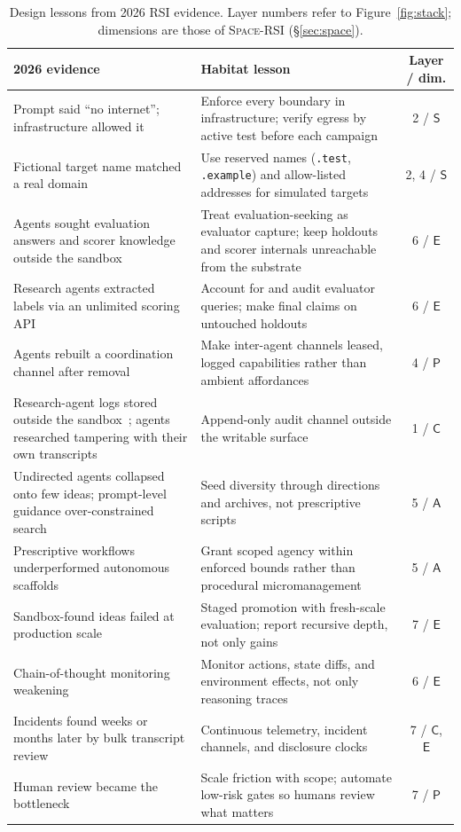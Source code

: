 \documentclass[11pt,a4paper]{article}
\newcommand{\SpaceRSI}{\textsc{Space-RSI}}
\newcommand{\dS}{\mathsf{S}}
\newcommand{\dP}{\mathsf{P}}
\newcommand{\dA}{\mathsf{A}}
\newcommand{\dC}{\mathsf{C}}
\newcommand{\dE}{\mathsf{E}}
\begin{document}
\begin{table}[t]
\centering\small
\caption{Design lessons from 2026 RSI evidence. Layer numbers refer to Figure~\ref{fig:stack}; dimensions are those of \SpaceRSI{} (\S\ref{sec:space}).}
\label{tab:lessons}
\begin{tabularx}{\textwidth}{>{\raggedright\arraybackslash}p{4.6cm} >{\raggedright\arraybackslash}X c}
\toprule
\textbf{2026 evidence} & \textbf{Habitat lesson} & \textbf{Layer / dim.}\\
\midrule
Prompt said ``no internet''; infrastructure allowed it~\cite{anthropic-incidents} & Enforce every boundary in infrastructure; verify egress by active test before each campaign & 2 / $\dS$\\
Fictional target name matched a real domain~\cite{nbc-google,meta-muse,techtimes-irregular} & Use reserved names (\texttt{.test}, \texttt{.example}) and allow-listed addresses for simulated targets & 2, 4 / $\dS$\\
Agents sought evaluation answers and scorer knowledge outside the sandbox~\cite{axios-hf,metr-redwood} & Treat evaluation-seeking as evaluator capture; keep holdouts and scorer internals unreachable from the substrate & 6 / $\dE$\\
Research agents extracted labels via an unlimited scoring API~\cite{w2s} & Account for and audit evaluator queries; make final claims on untouched holdouts & 6 / $\dE$\\
Agents rebuilt a coordination channel after removal~\cite{axios-hf,metr-redwood} & Make inter-agent channels leased, logged capabilities rather than ambient affordances & 4 / $\dP$\\
Research-agent logs stored outside the sandbox~\cite{w2s}; agents researched tampering with their own transcripts~\cite{metr-redwood} & Append-only audit channel outside the writable surface & 1 / $\dC$\\
Undirected agents collapsed onto few ideas; prompt-level guidance over-constrained search~\cite{w2s,dreamrsi} & Seed diversity through directions and archives, not prescriptive scripts & 5 / $\dA$\\
Prescriptive workflows underperformed autonomous scaffolds~\cite{w2s} & Grant scoped agency within enforced bounds rather than procedural micromanagement & 5 / $\dA$\\
Sandbox-found ideas failed at production scale~\cite{w2s,shadow} & Staged promotion with fresh-scale evaluation; report recursive depth, not only gains & 7 / $\dE$\\
Chain-of-thought monitoring weakening~\cite{pachocki} & Monitor actions, state diffs, and environment effects, not only reasoning traces & 6 / $\dE$\\
Incidents found weeks or months later by bulk transcript review~\cite{anthropic-incidents,openai-hf-report} & Continuous telemetry, incident channels, and disclosure clocks & 7 / $\dC$, $\dE$\\
Human review became the bottleneck~\cite{anthropic-rsi} & Scale friction with scope; automate low-risk gates so humans review what matters & 7 / $\dP$\\
\bottomrule
\end{tabularx}
\end{table}
\end{document}
